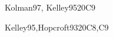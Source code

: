 \begin{syllabus}
\begin{unit}{\ALBasicAutomataComputabilityandComplexity}{}{Kolman97, Kelley95}{20}{C9}
\begin{learningoutcomes}
	\item \ALBasicAutomataComputabilityandComplexityLODiscussThe [\Assessment]
	\item \ALBasicAutomataComputabilityandComplexityLODesign [\Assessment]
	\item \ALBasicAutomataComputabilityandComplexityLOGenerate [\Assessment]
	\item \ALBasicAutomataComputabilityandComplexityLOExplainWhy [\Assessment]
	\item \ALBasicAutomataComputabilityandComplexityLODesignA [\Assessment]
	\item \ALBasicAutomataComputabilityandComplexityLODefine [\Assessment]
	\item \ALBasicAutomataComputabilityandComplexityLOExplainTheNp [\Assessment]
	\item \ALAdvancedAutomataTheoryandComputabilityLOExplainTheThesis [\Familiarity]
	\item \ALAdvancedAutomataTheoryandComputabilityLOExplainRices [\Familiarity]
	\item \ALAdvancedAutomataTheoryandComputabilityLOProvideExamples [\Familiarity]
	\item \ALAdvancedAutomataTheoryandComputabilityLOProveThat [\Familiarity]
\end{learningoutcomes}
\end{unit}

\begin{unit}{\ALAdvancedComputationalComplexity}{}{Kelley95,Hopcroft93}{20}{C8,C9}
\begin{topics}%
	\item \ALAdvancedComputationalComplexityTopicReview
	\item \ALAdvancedComputationalComplexityTopicPolynomial
	\item \ALAdvancedComputationalComplexityTopicNp
	\item \ALAdvancedComputationalComplexityTopicClassic
	\item \ALAdvancedComputationalComplexityTopicReduction
\end{topics}
\begin{learningoutcomes}
	\item \ALAdvancedComputationalComplexityLODefineThe [\Assessment]
	\item \ALAdvancedComputationalComplexityLODefineTheClass [\Assessment]
	\item \ALAdvancedComputationalComplexityLOExplainTheNpAppears [\Assessment]
	\item \ALAdvancedComputationalComplexityLOProvide [\Assessment]
	\item \ALAdvancedComputationalComplexityLOProve [\Assessment]
\end{learningoutcomes}
\end{unit}


\end{syllabus}
